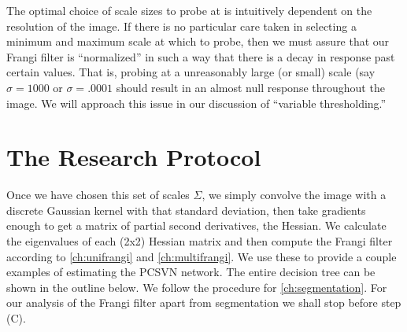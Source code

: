     The optimal choice of scale sizes to probe at is intuitively dependent on the resolution of the image. If there is no particular care taken in selecting a minimum and maximum scale at which to probe, then we must assure that our Frangi filter is ``normalized'' in such a way that there is a decay in response past certain values. That is, probing at a unreasonably large (or small) scale (say $\sigma=1000$ or $\sigma=.0001$ should result in an almost null response throughout the image. We will approach this issue in our discussion of ``variable thresholding.'' 
    
    \section{The Research Protocol}
    Once we have chosen this set of scales $\Sigma$, we simply convolve the image with a discrete Gaussian kernel with that standard deviation, then take gradients enough to get a matrix of partial second derivatives, the Hessian. We calculate the eigenvalues of each (2x2) Hessian matrix and then compute the Frangi filter according to \cref{ch:unifrangi} and \cref{ch:multifrangi}. We use these to provide a couple examples of estimating the PCSVN network. The entire decision tree can be shown in the outline below. We follow the procedure for \cref{ch:segmentation}. For our analysis of the Frangi filter apart from segmentation we shall stop before step (C).
    
